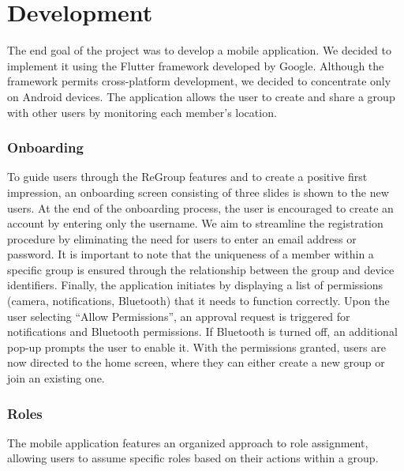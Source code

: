 \section{Development}
The end goal of the project was to develop a mobile application. We decided to implement it using the Flutter framework developed by Google. Although the framework permits cross-platform development, we decided to concentrate only on Android devices. The application allows the user to create and share a group with other users by monitoring each member's location.

\subsubsection*{Onboarding}
To guide users through the ReGroup features and to create a positive first impression, an onboarding screen consisting of three slides is shown to the new users. At the end of the onboarding process, the user is encouraged to create an account by entering only the username. We aim to streamline the registration procedure by eliminating the need for users to enter an email address or password. It is important to note that the uniqueness of a member within a specific group is ensured through the relationship between the group and device identifiers. Finally, the application initiates by displaying a list of permissions (camera, notifications, Bluetooth) that it needs to function correctly. Upon the user selecting ``Allow Permissions'', an approval request is triggered for notifications and Bluetooth permissions. If Bluetooth is turned off, an additional pop-up prompts the user to enable it. With the permissions granted, users are now directed to the home screen, where they can either create a new group or join an existing one.

\subsubsection*{Roles}
The mobile application features an organized approach to role assignment, allowing users to assume specific roles based on their actions within a group.

